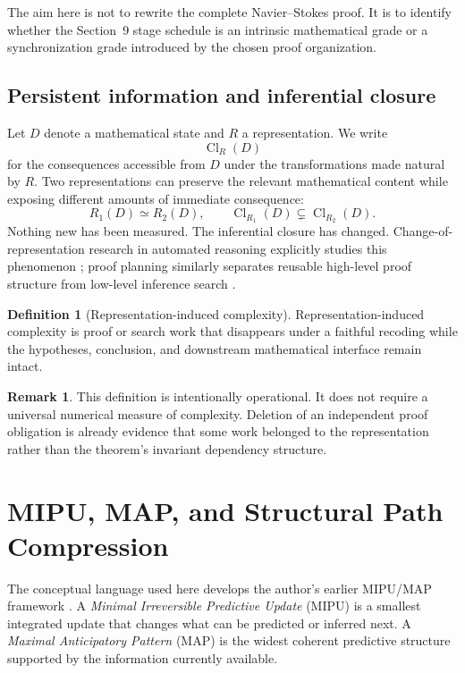 \documentclass[11pt]{article}
\numberwithin{equation}{section}
\theoremstyle{highend}
\theoremstyle{definition}
\newtheorem{definition}[theorem]{Definition}
\newtheorem{remark}[theorem]{Remark}
\newcommand{\Cl}{\operatorname{Cl}}
\begin{document}
The aim here is not to rewrite the complete Navier--Stokes proof. It is to identify whether the Section~9 stage schedule is an intrinsic mathematical grade or a synchronization grade introduced by the chosen proof organization.

\subsection{Persistent information and inferential closure}
Let $D$ denote a mathematical state and $R$ a representation. We write
\[
\Cl_R(D)
\]
for the consequences accessible from $D$ under the transformations made natural by $R$. Two representations can preserve the relevant mathematical content while exposing different amounts of immediate consequence:
\[
R_1(D)\simeq R_2(D),
\qquad
\Cl_{R_1}(D)\subsetneq \Cl_{R_2}(D).
\]
Nothing new has been measured. The inferential closure has changed. Change-of-representation research in automated reasoning explicitly studies this phenomenon \cite{Raggi2016,HolteZimmerMacDonald1992}; proof planning similarly separates reusable high-level proof structure from low-level inference search \cite{Bundy1988}.

\begin{definition}[Representation-induced complexity]
Representation-induced complexity is proof or search work that disappears under a faithful recoding while the hypotheses, conclusion, and downstream mathematical interface remain intact.
\end{definition}

\begin{remark}
This definition is intentionally operational. It does not require a universal numerical measure of complexity. Deletion of an independent proof obligation is already evidence that some work belonged to the representation rather than the theorem's invariant dependency structure.
\end{remark}

\section{MIPU, MAP, and Structural Path Compression}
The conceptual language used here develops the author's earlier MIPU/MAP framework \cite{Zot2026MIPUMAP}. A \emph{Minimal Irreversible Predictive Update} (MIPU) is a smallest integrated update that changes what can be predicted or inferred next. A \emph{Maximal Anticipatory Pattern} (MAP) is the widest coherent predictive structure supported by the information currently available.
\end{document}
